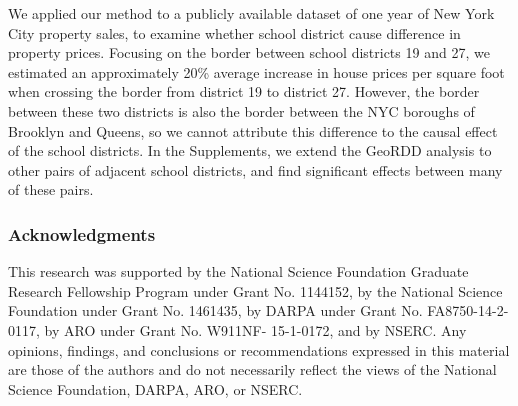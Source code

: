 \documentclass{article}
\begin{document}
We applied our method to a publicly available dataset of one year of New York City property sales, to examine whether school district cause difference in property prices.
Focusing on the border between school districts 19 and 27, we estimated an approximately 20\% average increase in house prices per square foot when crossing the border from district 19 to district 27.
However, the border between these two districts is also the border between the NYC boroughs of Brooklyn and Queens, so we cannot attribute this difference to the causal effect of the school districts.
In the Supplements, we extend the GeoRDD analysis to other pairs of adjacent school districts, and find significant effects between many of these pairs.

\newpage
\subsubsection*{Acknowledgments}
This research was supported by the National Science Foundation Graduate Research Fellowship Program under Grant No. 1144152, by the National Science Foundation under Grant No. 1461435, by DARPA under Grant No. FA8750-14-2-0117, by ARO under Grant No. W911NF- 15-1-0172, and by NSERC. Any opinions, findings, and conclusions or recommendations expressed in this material are those of the authors and do not necessarily reflect the views of the National Science Foundation, DARPA, ARO, or NSERC.




\end{document}
